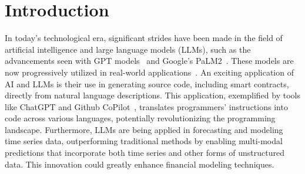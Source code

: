 \section{Introduction}


In today's technological era, significant strides have been made in the field of artificial intelligence and large language models (LLMs), such as the advancements seen with GPT models~\cite{brown2020language} and Google's PaLM2~\cite{anil2023palm}. These models are now progressively utilized in real-world applications~\cite{https://doi.org/10.48550/arxiv.2302.03202,brown2020language}. An exciting application of AI and LLMs is their use in generating source code, including smart contracts, directly from natural language descriptions. This application, exemplified by tools like ChatGPT and Github CoPilot~\cite{10.1145/3511861.3511863}, translates programmers' instructions into code across various languages, potentially revolutionizing the programming landscape. Furthermore, LLMs are being applied in forecasting and modeling time series data, outperforming traditional methods by enabling multi-modal predictions that incorporate both time series and other forms of unstructured data. This innovation could greatly enhance financial modeling techniques.


